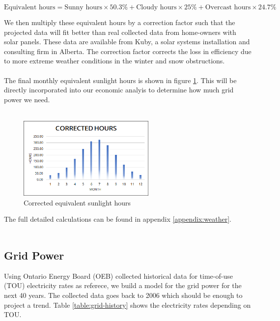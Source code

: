 \documentclass[10pt,letterpaper]{article}
\begin{document}
\begin{equation}
	\text{Equivalent hours}=\text{Sunny hours}\times50.3\%+\text{Cloudy hours}\times 25\% + \text{Overcast hours}\times 24.7\%
\end{equation}

We then multiply these equivalent hours by a correction factor such that the projected data will fit better than real collected data from home-owners with solar panels. These data are available from Kuby, a solar systems installation and consulting firm in Alberta\cite{kuby-complete-guide}. The correction factor corrects the loss in efficiency due to more extreme weather conditions in the winter and snow obstructions.\\
\\
The final monthly equivalent sunlight hours is shown in figure \ref{fig:weather-corrected}. This will be directly incorporated into our economic analyis to determine how much grid power we need.\\
\\
\begin{figure}[H]
	\centering
	\includegraphics[width=0.6\textwidth]{assets/1534572784062}
	\caption{Corrected equivalent sunlight hours}
	\label{fig:weather-corrected}
\end{figure}

The full detailed calculations can be found in appendix \ref{appendix:weather}.\\
\\

\subsection{Grid Power}\label{subsection:grid}

Using Ontario Energy Board (OEB) collected historical data for time-of-use (TOU) electricity rates as referece, we build a model for the grid power for the next 40 years\cite{oeb}. The collected data goes back to 2006 which should be enough to project a trend. Table \ref{table:grid-history} shows the electricity rates depending on TOU.\\
\end{document}
